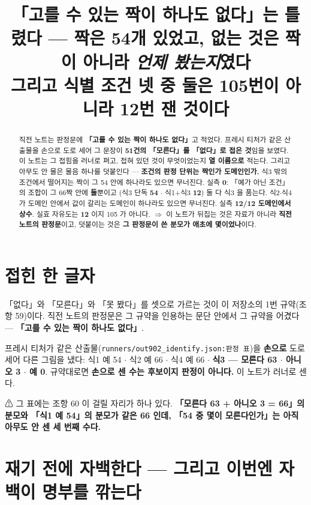 \documentclass{article}
\title{「고를 수 있는 짝이 하나도 없다」는 틀렸다 --- 짝은 54개 있었고, 없는 것은 짝이 아니라 \emph{언제 봤는지}였다 \\
  {\large 그리고 식별 조건 넷 중 둘은 105번이 아니라 12번 잰 것이다}}
\begin{document}
\maketitle

\begin{abstract}
직전 노트는 판정문에 \textbf{「고를 수 있는 짝이 하나도 없다」}고 적었다.
프레시 티처가 같은 산출물을 손으로 도로 세어 그 문장이 \textbf{51건의 「모른다」를
「없다」로 접은 것}임을 보였다. 이 노트는 그 접힘을 러너로 펴고, 접혀 있던 것이
무엇이었는지 \textbf{열 이름으로} 적는다. 그리고 아무도 안 물은 물음 하나를 덧붙인다 ---
\textbf{조건의 판정 단위는 짝인가 도메인인가.}
{식3 밖의 조건에서 떨어지는 짝이 그 54 안에 하나라도 있으면 무너진다.
실측 \textbf{0}: 「예가 아닌 조건」의 조합이 그 66짝 안에 \textbf{둘}뿐이고
(식3 단독 \textbf{54} $\cdot$ 식1+식3 \textbf{12}) 둘 다 식3 을 품는다.}
{식2$\cdot$식4 가 도메인 안에서 값이 갈리는 도메인이 하나라도 있으면 무너진다.
실측 \textbf{12/12 도메인에서 상수}. 실효 자유도는 \textbf{12} 이지 105 가 아니다.}
$\Rightarrow$ 이 노트가 뒤집는 것은 자료가 아니라 \textbf{직전 노트의 판정문}이고,
덧붙이는 것은 \textbf{그 판정문이 쓴 분모가 애초에 몇이었나}이다.
\end{abstract}

\section{접힌 한 글자}

「없다」와 「모른다」와 「못 봤다」를 셋으로 가르는 것이 이 저장소의 1번 규약(조항 59)이다.
직전 노트의 판정문은 그 규약을 인용하는 문단 안에서 그 규약을 어겼다 ---
\textbf{「고를 수 있는 짝이 하나도 없다」}.

프레시 티처가 같은 산출물(\texttt{runners/out902\_identify.json:판정 표})을
\textbf{손으로} 도로 세어 다른 그림을 냈다: 식1 예 54 $\cdot$ 식2 예 66 $\cdot$ 식4 예 66 $\cdot$
\textbf{식3 --- 모른다 63 $\cdot$ 아니오 3 $\cdot$ 예 0}.
규약대로면 \textbf{손으로 센 수는 후보이지 판정이 아니다.} 이 노트가 러너로 센다.

⚠ 그 표에는 조항 60 이 걸릴 자리가 하나 있다.
\textbf{「모른다 63 + 아니오 3 = 66」의 분모와 「식1 예 54」의 분모가 같은 66 인데,
「54 중 몇이 모른다인가」는 아직 아무도 안 센 세 번째 수다.}

\section{재기 전에 자백한다 --- 그리고 이번엔 자백이 명부를 깎는다}
\end{document}
